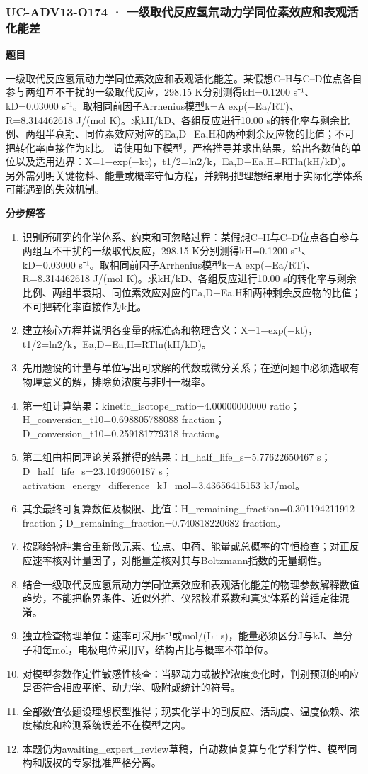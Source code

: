 \documentclass[UTF8,11pt,a4paper]{ctexart}
\begin{document}
\subsubsection*{UC-ADV13-O174 · 一级取代反应氢氘动力学同位素效应和表观活化能差}
\noindent\textbf{题目}\par
一级取代反应氢氘动力学同位素效应和表观活化能差。某假想C–H与C–D位点各自参与两组互不干扰的一级取代反应，298.15 K分别测得kH=0.1200 s⁻¹、kD=0.03000 s⁻¹。取相同前因子Arrhenius模型k=A exp(−Ea/RT)、R=8.314462618 J/(mol K)。求kH/kD、各组反应进行10.00 s的转化率与剩余比例、两组半衰期、同位素效应对应的Ea,D−Ea,H和两种剩余反应物的比值；不可把转化率直接作为k比。 请使用如下模型，严格推导并求出结果，给出各数值的单位以及适用边界：X=1−exp(−kt)，t1/2=ln2/k，Ea,D−Ea,H=RTln(kH/kD)。 另外需列明关键物料、能量或概率守恒方程，并辨明把理想结果用于实际化学体系可能遇到的失效机制。\par
\medskip\noindent\textbf{分步解答}
\begin{enumerate}
\item 识别所研究的化学体系、约束和可忽略过程：某假想C–H与C–D位点各自参与两组互不干扰的一级取代反应，298.15 K分别测得kH=0.1200 s⁻¹、kD=0.03000 s⁻¹。取相同前因子Arrhenius模型k=A exp(−Ea/RT)、R=8.314462618 J/(mol K)。求kH/kD、各组反应进行10.00 s的转化率与剩余比例、两组半衰期、同位素效应对应的Ea,D−Ea,H和两种剩余反应物的比值；不可把转化率直接作为k比。
\item 建立核心方程并说明各变量的标准态和物理含义：X=1−exp(−kt)，t1/2=ln2/k，Ea,D−Ea,H=RTln(kH/kD)。
\item 先用题设的计量与单位写出可求解的代数或微分关系；在逆问题中必须选取有物理意义的解，排除负浓度与非归一概率。
\item 第一组计算结果：kinetic\_isotope\_ratio=4.00000000000 ratio；H\_conversion\_t10=0.698805788088 fraction；D\_conversion\_t10=0.259181779318 fraction。
\item 第二组由相同理论关系推得的结果：H\_half\_life\_s=5.77622650467 s；D\_half\_life\_s=23.1049060187 s；activation\_energy\_difference\_kJ\_mol=3.43656415153 kJ/mol。
\item 其余最终可复算数值及极限、比值：H\_remaining\_fraction=0.301194211912 fraction；D\_remaining\_fraction=0.740818220682 fraction。
\item 按题给物种集合重新做元素、位点、电荷、能量或总概率的守恒检查；对正反应速率核对计量因子，对能量差核对其与Boltzmann指数的无量纲性。
\item 结合一级取代反应氢氘动力学同位素效应和表观活化能差的物理参数解释数值趋势，不能把临界条件、近似外推、仪器校准系数和真实体系的普适定律混淆。
\item 独立检查物理单位：速率可采用s⁻¹或mol/(L·s)，能量必须区分J与kJ、单分子和每mol，电极电位采用V，结构占比与概率不带单位。
\item 对模型参数作定性敏感性核查：当驱动力或被控浓度变化时，判别预测的响应是否符合相应平衡、动力学、吸附或统计的符号。
\item 全部数值依题设理想模型推得；现实化学中的副反应、活动度、温度依赖、浓度梯度和检测系统误差不在模型之内。
\item 本题仍为awaiting\_expert\_review草稿，自动数值复算与化学科学性、模型同构和版权的专家批准严格分离。
\end{enumerate}
\end{document}
